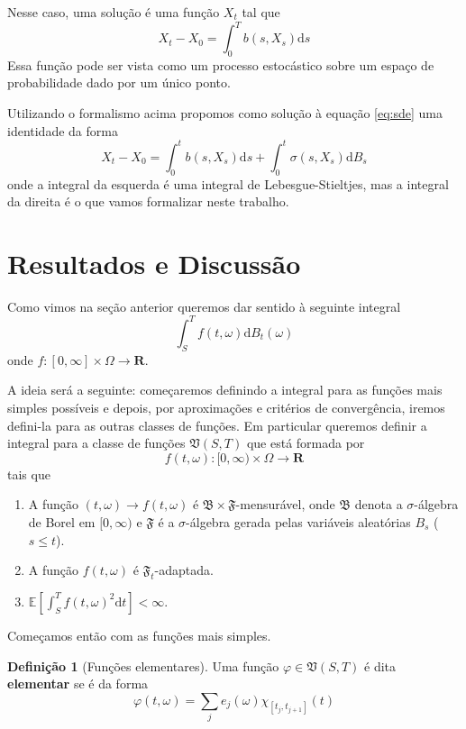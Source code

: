 \documentclass[12pt,a4paper]{article}
\theoremstyle{definition}
\newtheorem{definition}{Definição}
\begin{document}
Nesse caso, uma solução é uma função $X_t$ tal que
\begin{equation}
	X_t - X_0 = \int_0^T b(s, X_s) \mathrm{d}s
\end{equation}
Essa função pode ser vista como um processo estocástico sobre um espaço de probabilidade dado por um único ponto. 

Utilizando o formalismo acima propomos como solução à equação \eqref{eq:sde} uma identidade da forma
\begin{equation}\label{eq:sde-sol-prop}
	X_t - X_0 = \int_0^t b(s, X_s) \mathrm{d}s + \int_0^t \sigma(s, X_s) \mathrm{d}B_s
\end{equation}
onde a integral da esquerda é uma integral de Lebesgue-Stieltjes, mas a integral da direita é o que vamos formalizar neste trabalho. 

\section*{Resultados e Discussão}

Como vimos na seção anterior queremos dar sentido à seguinte integral
\begin{equation}\label{eq:gen_ito_integrand}
	\int_S^T f(t, \omega) \mathrm{d}B_t(\omega)
\end{equation}
onde $f : [0, \infty] \times \Omega \longrightarrow \textbf{R}$.

A ideia será a seguinte: começaremos definindo a integral para as funções mais simples possíveis e depois, por aproximações e critérios de convergência, iremos defini-la para as outras classes de funções. Em particular queremos definir a integral para   a classe de funções  $\mathfrak{V}(S,T)$ que está formada por 
	\[
		f(t, \omega) : [0, \infty) \times \Omega \longrightarrow \textbf{R}
	\]
	tais que
	\begin{enumerate}
		\item A função $(t, \omega) \longrightarrow f(t, \omega)$ é $\mathfrak{B} \times \mathfrak{F}$-mensurável, onde $\mathfrak{B}$ denota a $\sigma$-álgebra de Borel em $[0, \infty)$ e $\mathfrak{F}$ é a $\sigma$-álgebra gerada pelas variáveis aleatórias $B_s$ ($s \leq t$).
		\item A função $f(t,\omega)$ é $\mathfrak{F}_t$-adaptada.
		\item $\mathbb{E} \left[ \int_S^T f(t, \omega)^2 \mathrm{d}t \right] < \infty$.
	\end{enumerate}

Começamos então com as funções mais simples. 
\begin{definition}[Funções elementares]
		Uma função $\varphi \in \mathfrak{V}(S,T)$ é dita \textbf{elementar} se é da forma
	\begin{equation}
		\varphi(t, \omega) = \sum_j e_j(\omega) \chi_{[t_j, t_{j+1}]}(t)
	\end{equation}
\end{definition}
\end{document}
